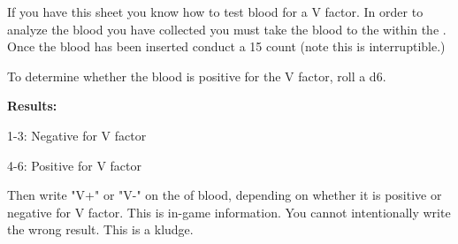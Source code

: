 \documentclass[green]{guildcamp4}
\begin{document}
\name{\gReadBlood{}}

If you have this sheet you know how to test blood for a V factor. In order to analyze the blood you have collected you must take the blood to the \sBloodAnalyzer{} within the \pBioLabC{}. 
Once the blood has been inserted conduct a 15 count (note this is interruptible.) 

To determine whether the blood is positive for the V factor, roll a d6.

{\bf Results:}

1-3: Negative for V factor

4-6: Positive for V factor

Then write "V+" or "V-" on the \iTestTube{} of blood, depending on whether it is positive or negative for V factor. This is in-game information. You cannot intentionally write the wrong result. This is a kludge.
\end{document}
